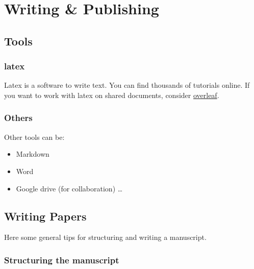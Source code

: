 \documentclass[
]{book}
\providecommand{\tightlist}{%
  \setlength{\itemsep}{0pt}\setlength{\parskip}{0pt}}
\begin{document}
\chapter{Writing \& Publishing}\label{writing-publishing}

\section{Tools}\label{tools}

\subsection{latex}\label{latex}

Latex is a software to write text. You can find thousands of tutorials
online. If you want to work with latex on shared documents, consider
\href{https://de.overleaf.com/}{overleaf}.

\subsection{Others}\label{others}

Other tools can be:

\begin{itemize}
\tightlist
\item
  Markdown
\item
  Word
\item
  Google drive (for collaboration) \ldots{}
\end{itemize}

\section{Writing Papers}\label{writing-papers}

Here some general tips for structuring and writing a manuscript.

\subsection{Structuring the manuscript}\label{structuring-the-manuscript}
\end{document}
